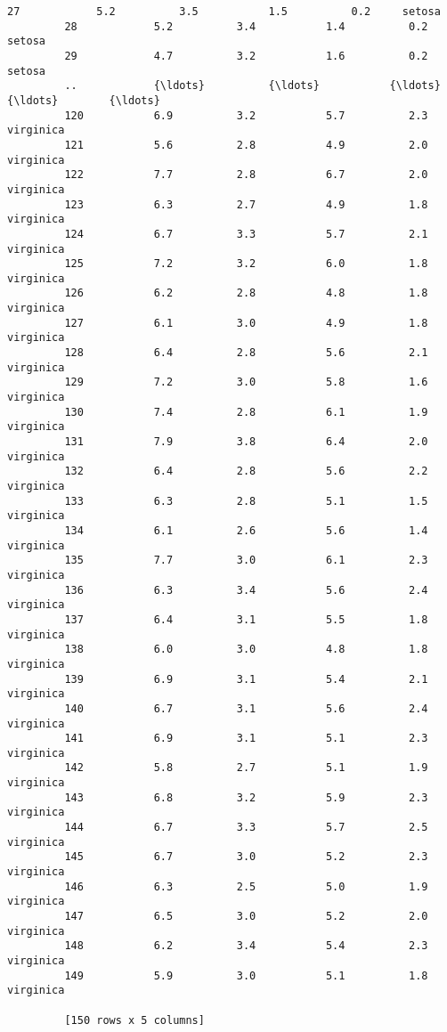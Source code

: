 \documentclass[11pt]{article}
\begin{document}
\begin{Verbatim}[commandchars=\\\{\}]
         27            5.2          3.5           1.5          0.2     setosa
         28            5.2          3.4           1.4          0.2     setosa
         29            4.7          3.2           1.6          0.2     setosa
         ..            {\ldots}          {\ldots}           {\ldots}          {\ldots}        {\ldots}
         120           6.9          3.2           5.7          2.3  virginica
         121           5.6          2.8           4.9          2.0  virginica
         122           7.7          2.8           6.7          2.0  virginica
         123           6.3          2.7           4.9          1.8  virginica
         124           6.7          3.3           5.7          2.1  virginica
         125           7.2          3.2           6.0          1.8  virginica
         126           6.2          2.8           4.8          1.8  virginica
         127           6.1          3.0           4.9          1.8  virginica
         128           6.4          2.8           5.6          2.1  virginica
         129           7.2          3.0           5.8          1.6  virginica
         130           7.4          2.8           6.1          1.9  virginica
         131           7.9          3.8           6.4          2.0  virginica
         132           6.4          2.8           5.6          2.2  virginica
         133           6.3          2.8           5.1          1.5  virginica
         134           6.1          2.6           5.6          1.4  virginica
         135           7.7          3.0           6.1          2.3  virginica
         136           6.3          3.4           5.6          2.4  virginica
         137           6.4          3.1           5.5          1.8  virginica
         138           6.0          3.0           4.8          1.8  virginica
         139           6.9          3.1           5.4          2.1  virginica
         140           6.7          3.1           5.6          2.4  virginica
         141           6.9          3.1           5.1          2.3  virginica
         142           5.8          2.7           5.1          1.9  virginica
         143           6.8          3.2           5.9          2.3  virginica
         144           6.7          3.3           5.7          2.5  virginica
         145           6.7          3.0           5.2          2.3  virginica
         146           6.3          2.5           5.0          1.9  virginica
         147           6.5          3.0           5.2          2.0  virginica
         148           6.2          3.4           5.4          2.3  virginica
         149           5.9          3.0           5.1          1.8  virginica
         
         [150 rows x 5 columns]
\end{Verbatim}
            
\end{document}
